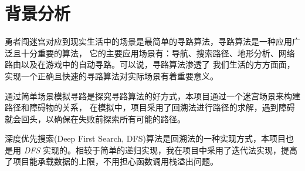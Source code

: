 
\chapter{背景分析}

勇者闯迷宫对应到现实生活中的场景是最简单的寻路算法，寻路算法是一种应用广泛且十分重要的算法，%
它的主要应用场景有：导航、搜索路径、地形分析、网络路由以及在游戏中的自动寻路。可以说，寻路算法渗透了%
我们生活的方方面面，实现一个正确且快速的寻路算法对实际场景有着重要意义。

通过简单场景模拟寻路是探究寻路算法的好方式，本项目通过一个迷宫场景来构建路径和障碍物的关系，%
在模拟中，项目采用了回溯法进行路径的求解，遇到障碍就会回头，以确保在失败前探索所有可能的路径。%

{\kaishu 深度优先搜索(Deep First Search, DFS)}算法是回溯法的一种实现方式，本项目也是用 \emph{DFS}%
实现的。相较于简单的递归实现，我在项目中采用了迭代法实现，提高了项目能承载数据的上限，不用担心函数调用栈溢出问题。

